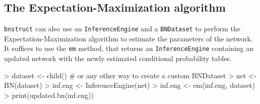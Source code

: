 \documentclass{article}
\newcommand{\Robject}[1]{{\texttt{#1}}}
\newcommand{\Rpackage}[1]{{\texttt{#1}}}
\newcommand{\Rmethod}[1]{{\texttt{#1}}}
\begin{document}
\subsection{The Expectation-Maximization algorithm}
\Rpackage{bnstruct} can also use an \Robject{InferenceEngine} and a \Robject{BNDataset} to perform
the Expectation-Maximization algorithm to estimate the parameters of the network.
It suffices to use the \Rmethod{em} method, that returns an \Robject{InferenceEngine} containing
an updated network with the newly estimated conditional probability tables.
\begin{Schunk}
\begin{Sinput}
> dataset <- child() # or any other way to create a custom BNDataset
> net     <- BN(dataset)
> inf.eng <- InferenceEngine(net)
> inf.eng <- em(inf.eng, dataset)
> print(updated.bn(inf.eng))
\end{Sinput}
\end{Schunk}
\end{document}
